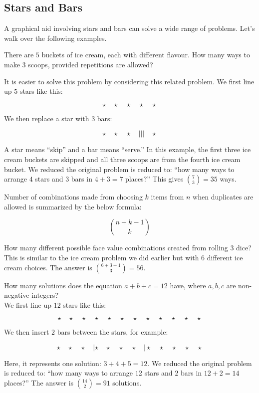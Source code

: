 \documentclass[12pt, a4paper]{article}
\newcounter{exa}
\begin{document}
\subsection{Stars and Bars}

A graphical aid involving stars and bars can solve a wide range of problems. Let's walk over the following examples.

\begin{texample}
There are $5$ buckets of ice cream, each with different flavour. How many ways to make $3$ scoops, provided repetitions are allowed?

It is easier to solve this problem by considering this related problem. We first line up $5$ stars like this:

$$\star\quad \star\quad \star\quad \star\quad \star$$

We then replace a star with $3$ bars:

$$\star\quad \star\quad \star\quad |||\quad \star$$

A star means ``skip'' and a bar means ``serve.'' In this example, the first three ice cream buckets are skipped and all three scoops are from the fourth ice cream bucket. We reduced the original problem is reduced to: ``how many ways to arrange $4$ stars and $3$ bars in $4+3=7$ places?'' This gives $\binom{7}{3}=35$ ways.
\end{texample}

Number of combinations made from choosing $k$ items from $n$ when duplicates are allowed is summarized by the below formula:

$$\binom{n+k-1}{k}$$

\begin{texample}
How many different possible face value combinations created from rolling $3$ dice? \\

This is similar to the ice cream problem we did earlier but with $6$ different ice cream choices. The answer is ${6+3-1 \choose 3}=56$.
\end{texample}

\begin{texample}
How many solutions does the equation $a+b+c=12$ have, where $a,b,c$ are non-negative integers? \\

We first line up $12$ stars like this:

$$\star\quad \star\quad \star\quad \star\quad \star\quad \star\quad \star\quad \star\quad \star\quad \star\quad \star\quad \star$$

We then insert $2$ bars between the stars, for example:

$$\star\quad \star\quad \star\quad |\star\quad \star\quad \star\quad \star\quad |\star\quad \star\quad \star\quad \star\quad \star$$

Here, it represents one solution: $3+4+5=12$. We reduced the original problem is reduced to: ``how many ways to arrange $12$ stars and $2$ bars in $12+2=14$ places?'' The answer is $\binom{14}{2}=91$ solutions.
\end{texample}
\end{document}
